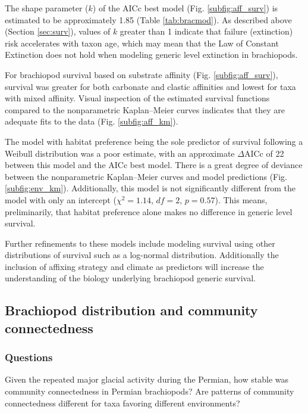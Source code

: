 \documentclass[12pt,letterpaper]{article}
\begin{document}
The shape parameter (\(k\)) of the AICc best model (Fig. \ref{subfig:aff_surv}) is estimated to be approximately 1.85 (Table \ref{tab:bracmod}). As described above (Section \ref{sec:surv}), values of \(k\) greater than 1 indicate that failure (extinction) risk accelerates with taxon age, which may mean that the Law of Constant Extinction does not hold when modeling generic level extinction in brachiopods.

For brachiopod survival based on substrate affinity (Fig. \ref{subfig:aff_surv}), survival was greater for both carbonate and clastic affinities and lowest for taxa with mixed affinity. Visual inspection of the estimated survival functions compared to the nonparametric Kaplan--Meier curves indicates that they are adequate fits to the data (Fig. \ref{subfig:aff_km}). 

The model with habitat preference being the sole predictor of survival following a Weibull distribution was a poor estimate, with an approximate \(\Delta\)AICc of 22 between this model and the AICc best model. There is a great degree of deviance between the nonparametric Kaplan--Meier curves and model predictions (Fig. \ref{subfig:env_km}). Additionally, this model is not significantly different from the model with only an intercept (\(\chi^{2} = 1.14\), \(df = 2\), \(p = 0.57\)). This means, preliminarily, that habitat preference alone makes no difference in generic level survival.

Further refinements to these models include modeling survival using other distributions of survival such as a log-normal distribution. Additionally the inclusion of affixing strategy and climate as predictors will increase the understanding of the biology underlying brachiopod generic survival. 

\subsection{Brachiopod distribution and community connectedness} \label{sec:braccom}
\subsubsection{Questions} \label{sec:braccomques}
Given the repeated major glacial activity during the Permian, how stable was community connectedness in Permian brachiopods? Are patterns of community connectedness different for taxa favoring different environments?
\end{document}
